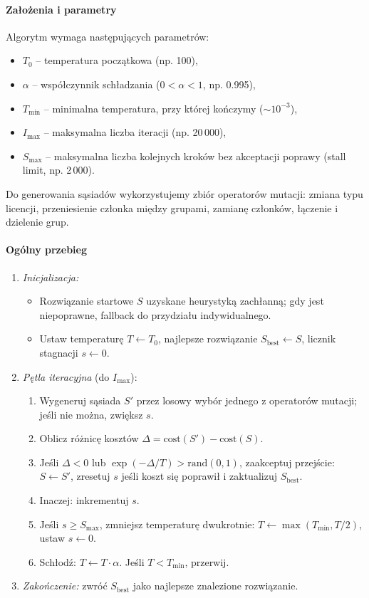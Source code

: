 \paragraph{Założenia i parametry}  
Algorytm wymaga następujących parametrów:
\begin{itemize}
  \item $T_0$ – temperatura początkowa (np. 100),
  \item $\alpha$ – współczynnik schładzania ($0<\alpha<1$, np. 0{.}995),
  \item $T_{\min}$ – minimalna temperatura, przy której kończymy ($\sim10^{-3}$),
  \item $I_{\max}$ – maksymalna liczba iteracji (np. 20\,000),
  \item $S_{\max}$ – maksymalna liczba kolejnych kroków bez akceptacji poprawy (stall limit, np. 2\,000).
\end{itemize}
Do generowania sąsiadów wykorzystujemy zbiór operatorów mutacji: zmiana typu licencji, przeniesienie członka między grupami, zamianę członków, łączenie i dzielenie grup.

\paragraph{Ogólny przebieg}  
\begin{enumerate}
  \item \emph{Inicjalizacja:}  
    \begin{itemize}
      \item Rozwiązanie startowe $S$ uzyskane heurystyką zachłanną; gdy jest niepoprawne, fallback do przydziału indywidualnego.
      \item Ustaw temperaturę $T\leftarrow T_0$, najlepsze rozwiązanie $S_{\mathrm{best}}\leftarrow S$, licznik stagnacji $s\leftarrow0$.
    \end{itemize}
  \item \emph{Pętla iteracyjna} (do $I_{\max}$):
    \begin{enumerate}
      \item Wygeneruj sąsiada $S'$ przez losowy wybór jednego z operatorów mutacji; jeśli nie można, zwiększ $s$.
      \item Oblicz różnicę kosztów $\Delta = \mathrm{cost}(S') - \mathrm{cost}(S)$.
      \item Jeśli $\Delta<0$ lub $\exp(-\Delta / T) > \mathrm{rand}(0,1)$, zaakceptuj przejście: $S\leftarrow S'$, zresetuj $s$ jeśli koszt się poprawił i zaktualizuj $S_{\mathrm{best}}$.
      \item Inaczej: inkrementuj $s$.
      \item Jeśli $s\ge S_{\max}$, zmniejsz temperaturę dwukrotnie: $T\leftarrow\max(T_{\min}, T/2)$, ustaw $s\leftarrow0$.
      \item Schłodź: $T\leftarrow T\cdot\alpha$. Jeśli $T<T_{\min}$, przerwij.
    \end{enumerate}
  \item \emph{Zakończenie:} zwróć $S_{\mathrm{best}}$ jako najlepsze znalezione rozwiązanie.
\end{enumerate}


